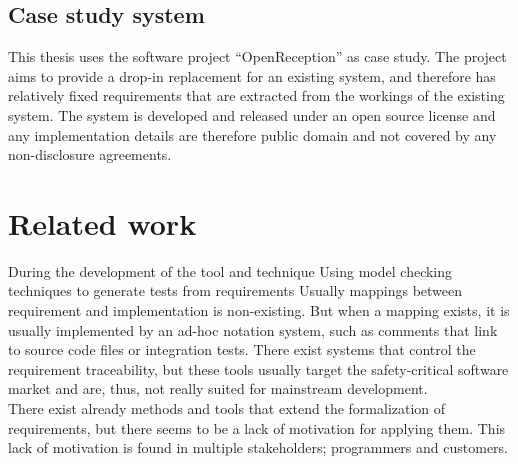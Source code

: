
\subsection{Case study system}
This thesis uses the software project ``OpenReception'' as case study. The project aims to provide a drop-in replacement for an existing system, and therefore has relatively fixed requirements that are extracted from the workings of the existing system. The system is developed and released under an open source license and any implementation details are therefore public domain and not covered by any non-disclosure agreements.

\section{Related work}
During the development of the tool and technique 
Using model checking techniques to generate tests from requirements\cite{gargantini1999using}
Usually mappings between requirement and implementation is non-existing. But when a mapping exists, it is usually implemented by an ad-hoc notation system, such as comments that link to source code files or integration tests. There exist systems that control the requirement traceability, but these tools usually target the safety-critical software market and are, thus, not really suited for mainstream development.\\%

There exist already methods and tools that extend the formalization of requirements, but there seems to be a lack of motivation for applying them. This lack of motivation is found in multiple stakeholders; programmers and customers.
